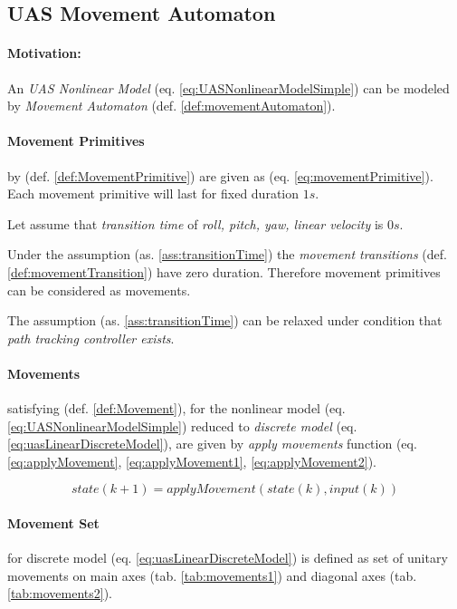 \subsection{UAS Movement Automaton}\label{s:movementAutomatonDefinition}

\paragraph{Motivation:} An \emph{UAS Nonlinear Model} (eq. \ref{eq:UASNonlinearModelSimple}) can be modeled by \emph{Movement Automaton} (def. \ref{def:movementAutomaton}). 

\paragraph{Movement Primitives} by (def. \ref{def:MovementPrimitive})  are given as (eq. \ref{eq:movementPrimitive}). Each movement primitive will last for fixed duration $1s$.
 

\begin{assumption}\label{ass:transitionTime}
    Let assume that \emph{transition time} of \emph{roll, pitch, yaw, linear velocity} is $0 s$.
\end{assumption}

Under the assumption (as. \ref{ass:transitionTime}) the \emph{movement transitions} (def. \ref{def:movementTransition}) have zero duration. Therefore movement primitives can be considered as movements.

\begin{note}
    The assumption (as. \ref{ass:transitionTime}) can be relaxed under condition that \emph{path tracking controller exists}.
\end{note}

\paragraph{Movements} satisfying (def. \ref{def:Movement}), for the nonlinear model (eq. \ref{eq:UASNonlinearModelSimple}) reduced to \emph{discrete model} (eq. \ref{eq:uasLinearDiscreteModel}), are given by \emph{apply movements} function (eq. \ref{eq:applyMovement}, \ref{eq:applyMovement1}, \ref{eq:applyMovement2}).

\begin{equation}\label{eq:uasLinearDiscreteModel}
    state(k+1) = applyMovement(state(k), input(k)) 
\end{equation}

\paragraph{Movement Set} for discrete model (eq. \ref{eq:uasLinearDiscreteModel}) is defined as set of unitary movements on main axes (tab. \ref{tab:movements1}) and diagonal axes (tab. \ref{tab:movements2}). 

